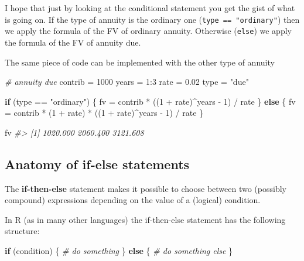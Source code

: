 \documentclass[
]{book}
\newenvironment{Shaded}{\begin{snugshade}}{\end{snugshade}}
\newcommand{\CommentTok}[1]{\textcolor[rgb]{0.56,0.35,0.01}{\textit{#1}}}
\newcommand{\ControlFlowTok}[1]{\textcolor[rgb]{0.13,0.29,0.53}{\textbf{#1}}}
\newcommand{\DecValTok}[1]{\textcolor[rgb]{0.00,0.00,0.81}{#1}}
\newcommand{\FloatTok}[1]{\textcolor[rgb]{0.00,0.00,0.81}{#1}}
\newcommand{\NormalTok}[1]{#1}
\newcommand{\OtherTok}[1]{\textcolor[rgb]{0.56,0.35,0.01}{#1}}
\newcommand{\SpecialCharTok}[1]{\textcolor[rgb]{0.00,0.00,0.00}{#1}}
\newcommand{\StringTok}[1]{\textcolor[rgb]{0.31,0.60,0.02}{#1}}
\begin{document}
I hope that just by looking at the conditional statement you get the gist of
what is going on. If the type of annuity is the ordinary one
(\texttt{type\ ==\ "ordinary"}) then we apply the formula of the FV of ordinary annuity.
Otherwise (\texttt{else}) we apply the formula of the FV of annuity due.

The same piece of code can be implemented with the other type of annuity

\begin{Shaded}
\begin{Highlighting}[]
\CommentTok{\# annuity due}
\NormalTok{contrib }\OtherTok{=} \DecValTok{1000}
\NormalTok{years }\OtherTok{=} \DecValTok{1}\SpecialCharTok{:}\DecValTok{3}
\NormalTok{rate }\OtherTok{=} \FloatTok{0.02}
\NormalTok{type }\OtherTok{=} \StringTok{"due"}
  
\ControlFlowTok{if}\NormalTok{ (type }\SpecialCharTok{==} \StringTok{"ordinary"}\NormalTok{) \{}
\NormalTok{  fv }\OtherTok{=}\NormalTok{ contrib }\SpecialCharTok{*}\NormalTok{ ((}\DecValTok{1} \SpecialCharTok{+}\NormalTok{ rate)}\SpecialCharTok{\^{}}\NormalTok{years }\SpecialCharTok{{-}} \DecValTok{1}\NormalTok{) }\SpecialCharTok{/}\NormalTok{ rate}
\NormalTok{\} }\ControlFlowTok{else}\NormalTok{ \{}
\NormalTok{  fv }\OtherTok{=}\NormalTok{ contrib }\SpecialCharTok{*}\NormalTok{ (}\DecValTok{1} \SpecialCharTok{+}\NormalTok{ rate) }\SpecialCharTok{*}\NormalTok{ ((}\DecValTok{1} \SpecialCharTok{+}\NormalTok{ rate)}\SpecialCharTok{\^{}}\NormalTok{years }\SpecialCharTok{{-}} \DecValTok{1}\NormalTok{) }\SpecialCharTok{/}\NormalTok{ rate}
\NormalTok{\}}

\NormalTok{fv}
\CommentTok{\#\textgreater{} [1] 1020.000 2060.400 3121.608}
\end{Highlighting}
\end{Shaded}

\hypertarget{anatomy-of-if-else-statements}{%
\subsection{Anatomy of if-else statements}\label{anatomy-of-if-else-statements}}

The \textbf{if-then-else} statement makes it possible to choose between two
(possibly compound) expressions depending on the value of a (logical) condition.

In R (as in many other languages) the if-then-else statement has the following
structure:

\begin{Shaded}
\begin{Highlighting}[]
\ControlFlowTok{if}\NormalTok{ (condition) \{}
  \CommentTok{\# do something}
\NormalTok{\} }\ControlFlowTok{else}\NormalTok{ \{}
  \CommentTok{\# do something else}
\NormalTok{\}}
\end{Highlighting}
\end{Shaded}
\end{document}
